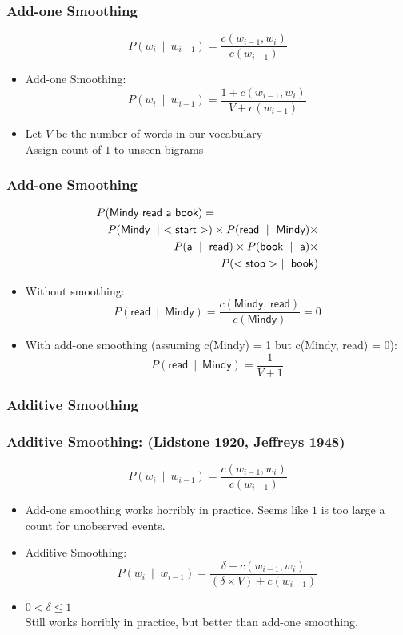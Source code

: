 \begin{frame}
\frametitle{Add-one Smoothing}
\[ P(w_i~\mid~w_{i-1}) = \frac{ c(w_{i-1},w_i) } { c(w_{i-1}) } \]
\begin{itemize}[<+->]
\item Add-one Smoothing:
\[ P(w_i~\mid~w_{i-1}) = \frac{ 1 + c(w_{i-1},w_i) } { V + c(w_{i-1}) } \]
\item Let $V$ be the number of words in our vocabulary \\
 Assign count of $1$ to unseen bigrams
\end{itemize}
\end{frame}

\begin{frame}
\frametitle{Add-one Smoothing}
\begin{eqnarray*}
\lefteqn{P(\textsf{Mindy read a book})=}\\
&& P(\textsf{Mindy}~\mid~<\textsf{start}>) \times P(\textsf{read}~\mid~\textsf{Mindy}) \times \\
&& P(\textsf{a}~\mid~\textsf{read}) \times P(\textsf{book}~\mid~\textsf{a}) \times \\
&& P(<\textsf{stop}>~\mid~\textsf{book})
\end{eqnarray*}
\begin{itemize}[<+->]
\item Without smoothing:
\[ P(\textsf{read}~\mid~\textsf{Mindy}) = \frac{ c(\textsf{Mindy, read}) } { c(\textsf{Mindy}) }  = 0 \]
\item With add-one smoothing (assuming c(Mindy) = 1 but c(Mindy, read)
  = 0):
\[ P(\textsf{read}~\mid~\textsf{Mindy}) = \frac{ 1 } { V + 1 }  \]
\end{itemize}
\end{frame}

\subsubsection{Additive Smoothing}

\begin{frame}
\frametitle{Additive Smoothing: (Lidstone 1920, Jeffreys 1948)} 
\[ P(w_i~\mid~w_{i-1}) = \frac{ c(w_{i-1},w_i) } { c(w_{i-1}) } \]
\begin{itemize}[<+->]
\item Add-one smoothing works horribly in practice. Seems like $1$ is too large a count for unobserved events.
\item Additive Smoothing:
\[ P(w_i~\mid~w_{i-1}) = \frac{ \delta + c(w_{i-1},w_i) } { (\delta \times V) + c(w_{i-1}) } \]
\item $0 < \delta \leq 1$ \\
Still works horribly in practice, but better than add-one smoothing.
\end{itemize}
\end{frame}

